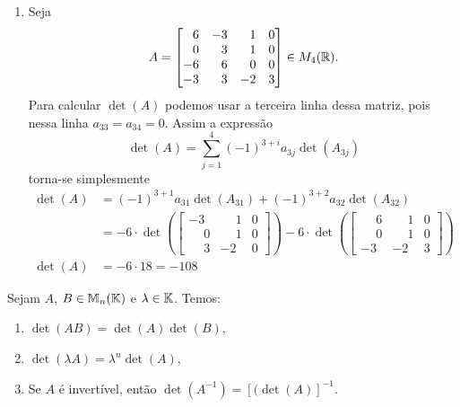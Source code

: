 \begin{exemplo}
\begin{enumerate}[label={\arabic*})]
        \item Seja
        \[
            A = \begin{bmatrix}
                \phantom{-}6 & -3 & \phantom{-}1 & 0\\
                \phantom{-}0 & \phantom{-}3 & \phantom{-}1 & 0\\
                -6 & \phantom{-}6 & \phantom{-}0 & 0\\
                -3 & \phantom{-}3 & -2 & 3
            \end{bmatrix} \in M_4(\mathbb{R}).
        \]
        Para calcular $\det(A)$ podemos usar a terceira linha dessa matriz, pois nessa linha $a_{33} = a_{34} = 0$. Assim a expressão
        \[
            \det(A) = \sum_{j = 1}^4(-1)^{3 + i}a_{3j}\det(A_{3j})
        \]
        torna-se simplesmente
        \begin{align*}
            \det(A) &= (-1)^{3 + 1}a_{31}\det(A_{31}) + (-1)^{3 + 2}a_{32}\det(A_{32}) \\ &=
            -6\cdot\det\left(\begin{bmatrix}-3 & \phantom{-}1 & 0\\\phantom{-}0 & \phantom{-}1 & 0\\\phantom{-}3 & -2 & 0
                \end{bmatrix}\right) -6\cdot\det\left(\begin{bmatrix}\phantom{-}6 & \phantom{-}1 & 0\\\phantom{-}0 & \phantom{-}1 & 0\\
        -3 & -2 & 3\end{bmatrix}\right)\\
            \det(A) &= -6\cdot 18 = -108
        \end{align*}
    \end{enumerate}
\end{exemplo}

\begin{proposicao}
    Sejam $A$, $B \in \mathbb{M}_n(\mathbb{K})$ e $\lambda \in \mathbb{K}$. Temos:
    \begin{enumerate}[label={\roman*})]
        \item $\det(AB) = \det(A) \det(B)$,
        \item $\det(\lambda A) = \lambda^n \det(A)$,
        \item Se $A$ é invertível, então $\det(A^{-1}) = [(\det(A)]^{-1}$.
    \end{enumerate}
\end{proposicao}

